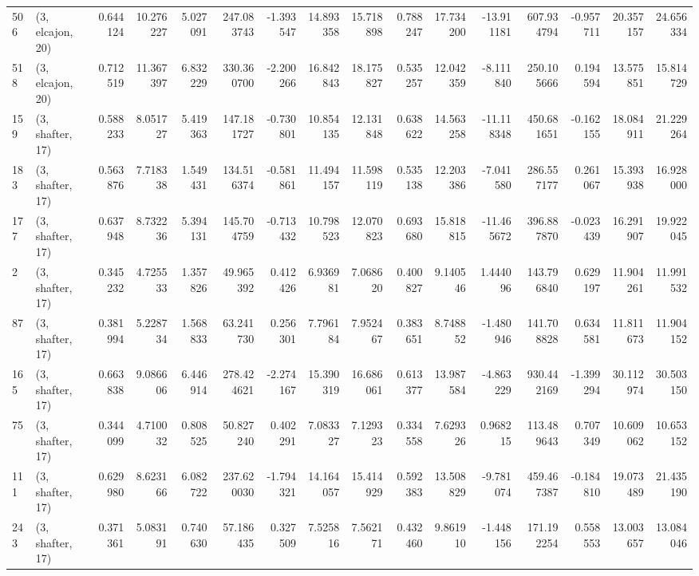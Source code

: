 \begin{tabular}{llrrrrrrrrrrrrrr}
506 &  (3, elcajon, 20) &   0.644124 &  10.276227 &   5.027091 &   247.083743 &  -1.393547 &  14.893358 &  15.718898 &  0.788247 &  17.734200 & -13.911181 &    607.934794 &  -0.957711 &   20.357157 &   24.656334 \\
518 &  (3, elcajon, 20) &   0.712519 &  11.367397 &   6.832229 &   330.360700 &  -2.200266 &  16.842843 &  18.175827 &  0.535257 &  12.042359 &  -8.111840 &    250.105666 &   0.194594 &   13.575851 &   15.814729 \\
159 &  (3, shafter, 17) &   0.588233 &   8.051727 &   5.419363 &   147.181727 &  -0.730801 &  10.854135 &  12.131848 &  0.638622 &  14.563258 & -11.118348 &    450.681651 &  -0.162155 &   18.084911 &   21.229264 \\
183 &  (3, shafter, 17) &   0.563876 &   7.718338 &   1.549431 &   134.516374 &  -0.581861 &  11.494157 &  11.598119 &  0.535138 &  12.203386 &  -7.041580 &    286.557177 &   0.261067 &   15.393938 &   16.928000 \\
177 &  (3, shafter, 17) &   0.637948 &   8.732236 &   5.394131 &   145.704759 &  -0.713432 &  10.798523 &  12.070823 &  0.693680 &  15.818815 & -11.465672 &    396.887870 &  -0.023439 &   16.291907 &   19.922045 \\
2   &  (3, shafter, 17) &   0.345232 &   4.725533 &   1.357826 &    49.965392 &   0.412426 &   6.936981 &   7.068620 &  0.400827 &   9.140546 &   1.444096 &    143.796840 &   0.629197 &   11.904261 &   11.991532 \\
87  &  (3, shafter, 17) &   0.381994 &   5.228734 &   1.568833 &    63.241730 &   0.256301 &   7.796184 &   7.952467 &  0.383651 &   8.748852 &  -1.480946 &    141.708828 &   0.634581 &   11.811673 &   11.904152 \\
165 &  (3, shafter, 17) &   0.663838 &   9.086606 &   6.446914 &   278.424621 &  -2.274167 &  15.390319 &  16.686061 &  0.613377 &  13.987584 &  -4.863229 &    930.442169 &  -1.399294 &   30.112974 &   30.503150 \\
75  &  (3, shafter, 17) &   0.344099 &   4.710032 &   0.808525 &    50.827240 &   0.402291 &   7.083327 &   7.129323 &  0.334558 &   7.629326 &   0.968215 &    113.489643 &   0.707349 &   10.609062 &   10.653152 \\
111 &  (3, shafter, 17) &   0.629980 &   8.623166 &   6.082722 &   237.620030 &  -1.794321 &  14.164057 &  15.414929 &  0.592383 &  13.508829 &  -9.781074 &    459.467387 &  -0.184810 &   19.073489 &   21.435190 \\
243 &  (3, shafter, 17) &   0.371361 &   5.083191 &   0.740630 &    57.186435 &   0.327509 &   7.525816 &   7.562171 &  0.432460 &   9.861910 &  -1.448156 &    171.192254 &   0.558553 &   13.003657 &   13.084046 \\

\end{tabular}
